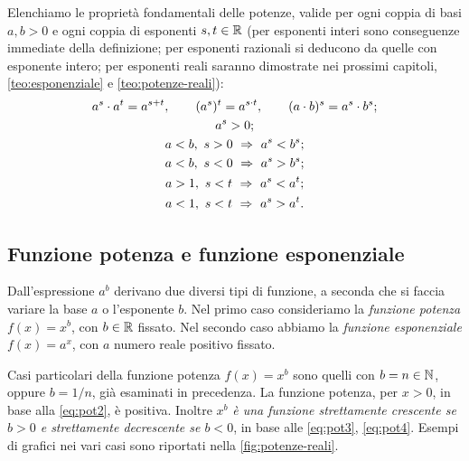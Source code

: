 Elenchiamo le proprietà fondamentali delle potenze, valide per ogni coppia di basi
$a,b>0$ e ogni coppia di esponenti $s,t\in\mathbb{R}$ (per esponenti interi sono conseguenze
immediate della definizione; per esponenti razionali si deducono da quelle con esponente
intero; per esponenti reali saranno dimostrate nei prossimi capitoli,
\cref{teo:esponenziale} e \cref{teo:potenze-reali}):
\begin{gather}
  a^{s}\cdot a^{t}=a^{s+t}, \qquad (a^{s})^{t}=a^{s\cdot t}, \qquad (a\cdot b)^{s}=a^{s}\cdot b^{s}; \label{eq:pot1}\\
  a^{s}>0; \label{eq:pot2}\\
  a<b,\ s>0 \ \Rightarrow\ a^{s}<b^{s}; \label{eq:pot3}\\
  a<b,\ s<0 \ \Rightarrow\ a^{s}>b^{s}; \label{eq:pot4}\\
  a>1,\ s<t \ \Rightarrow\ a^{s}<a^{t}; \label{eq:pot5}\\
  a<1,\ s<t \ \Rightarrow\ a^{s}>a^{t}. \label{eq:pot6}
\end{gather}

\subsection{Funzione potenza e funzione esponenziale}

Dall'espressione $a^{b}$ derivano due diversi tipi di funzione, a seconda che si faccia
variare la base $a$ o l'esponente $b$. Nel primo caso consideriamo la \emph{funzione
potenza} $f(x)=x^{b}$, con $b\in\mathbb{R}$ fissato. Nel secondo caso abbiamo la \emph{funzione
esponenziale} $f(x)=a^{x}$, con $a$ numero reale positivo
fissato.

Casi particolari della funzione potenza $f(x)=x^{b}$ sono quelli con $b=n\in\mathbb{N}$, oppure
$b=1/n$, già esaminati in precedenza. La funzione potenza, per $x>0$, in base alla
\eqref{eq:pot2}, è positiva. Inoltre $x^{b}$ \emph{è una funzione strettamente crescente
se $b>0$ e strettamente decrescente se $b<0$}, in base alle \eqref{eq:pot3},
\eqref{eq:pot4}. Esempi di grafici nei vari casi sono riportati nella
\cref{fig:potenze-reali}.

